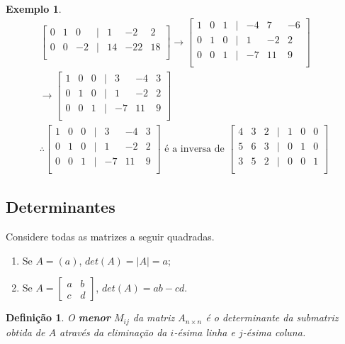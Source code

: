 \documentclass{article}
\newtheorem*{definition}{Definição}
\newtheorem*{example}{Exemplo}
\begin{document}
\begin{example}
\begin{align*}
\begin{bmatrix}
	0 & 1 & 0 & | & 1 & -2 & 2 \\
	0 & 0 & -2 & | & 14 & -22 & 18 \\
	\end{bmatrix}\to\begin{bmatrix}
	1 & 0 & 1 & | & -4 & 7 & -6 \\
	0 & 1 & 0 & | & 1 & -2 & 2 \\
	0 & 0 & 1 & | & -7 & 11 & 9 \\
	\end{bmatrix}\\
	\to\begin{bmatrix}
	1 & 0 & 0 & | & 3 & -4 & 3 \\
	0 & 1 & 0 & | & 1 & -2 & 2 \\
	0 & 0 & 1 & | & -7 & 11 & 9 \\
	\end{bmatrix} \\ 
	\therefore\begin{bmatrix}
	1 & 0 & 0 & | & 3 & -4 & 3 \\
	0 & 1 & 0 & | & 1 & -2 & 2 \\
	0 & 0 & 1 & | & -7 & 11 & 9 \\
	\end{bmatrix}\text{ é a inversa de }\begin{bmatrix}
	4 & 3 & 2 & | & 1 & 0 & 0 \\
	5 & 6 & 3 & | & 0 & 1 & 0 \\
	3 & 5 & 2 & | & 0 & 0 & 1 \\
	\end{bmatrix}
	\end{align*}
\end{example}

\subsection{Determinantes}
\hspace{12pt} Considere todas as matrizes a seguir quadradas.
\begin{enumerate}
	\item Se $A = (a)$, $det(A) = |A| = a$;
	\item Se $A = \begin{bmatrix}
	a & b \\
	c & d
	\end{bmatrix}$, $det(A) = ab - cd$.
\end{enumerate}

\begin{definition}
	O \textbf{menor} $M_{ij}$ da matriz $A_{n\times n}$ é o determinante da submatriz obtida de $A$ através da eliminação da $i$-ésima linha e $j$-ésima coluna.
\end{definition}
\end{document}
